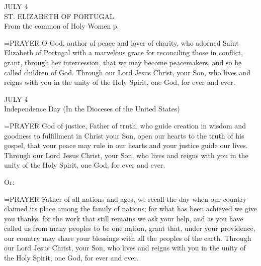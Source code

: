 \begin{center}\normalsize JULY 4\\
\footnotesize ST. ELIZABETH OF PORTUGAL\\
\footnotesize From the common of Holy Women p.     \\
\end{center}

\hangindent=\parindent \small{PRAYER 
O God, author of peace and lover of charity,
who adorned Saint Elizabeth of Portugal
with a marvelous grace for reconciling those in conflict,
grant, through her intercession,
that we may become peacemakers,
and so be called children of God.
Through our Lord Jesus Christ, your Son,
who lives and reigns with you in the unity of the Holy Spirit,
one God, for ever and ever.	\\}
 
\begin{center}\normalsize JULY 4\\
\footnotesize Independence Day (In the Dioceses of the United States)\\
\end{center}

\hangindent=\parindent \small{PRAYER 
God of justice, Father of truth,
who guide creation in wisdom and goodness
to fulfillment in Christ your Son,
open our hearts to the truth of his gospel,
that your peace may rule in our hearts
and your justice guide our lives.
Through our Lord Jesus Christ, your Son,
who lives and reigns with you in the unity of the Holy Spirit,
one God, for ever and ever.\\}
 
Or:

\hangindent=\parindent \small{PRAYER 
Father of all nations and ages,
we recall the day when our country
claimed its place among the family of nations;
for what has been achieved we give you thanks,
for the work that still remains we ask your help,
and as you have called us from many peoples to be one nation,
grant that, under your providence,
our country may share your blessings
with all the peoples of the earth.
Through our Lord Jesus Christ, your Son,
who lives and reigns with you in the unity of the Holy Spirit,
one God, for ever and ever.\\}
 

